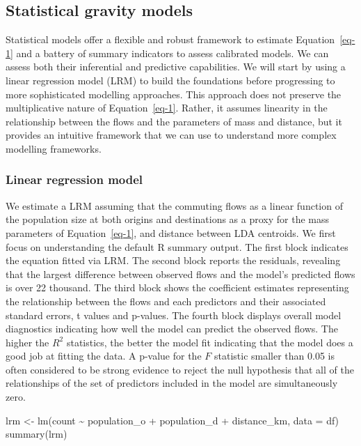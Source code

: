 \documentclass[
  a4paper, 
  twoside,
  final
]{article}
\newenvironment{Shaded}{\begin{snugshade}}{\end{snugshade}}
\newcommand{\AttributeTok}[1]{\textcolor[rgb]{0.40,0.45,0.13}{#1}}
\newcommand{\FunctionTok}[1]{\textcolor[rgb]{0.28,0.35,0.67}{#1}}
\newcommand{\NormalTok}[1]{\textcolor[rgb]{0.00,0.23,0.31}{#1}}
\newcommand{\OtherTok}[1]{\textcolor[rgb]{0.00,0.23,0.31}{#1}}
\newcommand{\SpecialCharTok}[1]{\textcolor[rgb]{0.37,0.37,0.37}{#1}}
\begin{document}
\hypertarget{statistical-gravity-models}{%
\subsection{Statistical gravity
models}\label{statistical-gravity-models}}

Statistical models offer a flexible and robust framework to estimate
Equation~\ref{eq-1} and a battery of summary indicators to assess
calibrated models. We can assess both their inferential and predictive
capabilities. We will start by using a linear regression model (LRM) to
build the foundations before progressing to more sophisticated modelling
approaches. This approach does not preserve the multiplicative nature of
Equation~\ref{eq-1}. Rather, it assumes linearity in the relationship
between the flows and the parameters of mass and distance, but it
provides an intuitive framework that we can use to understand more
complex modelling frameworks.

\hypertarget{linear-regression-model}{%
\subsubsection{Linear regression model}\label{linear-regression-model}}

We estimate a LRM assuming that the commuting flows as a linear function
of the population size at both origins and destinations as a proxy for
the mass parameters of Equation~\ref{eq-1}, and distance between LDA
centroids. We first focus on understanding the default R summary output.
The first block indicates the equation fitted via LRM. The second block
reports the residuals, revealing that the largest difference between
observed flows and the model's predicted flows is over 22 thousand. The
third block shows the coefficient estimates representing the
relationship between the flows and each predictors and their associated
standard errors, t values and p-values. The fourth block displays
overall model diagnostics indicating how well the model can predict the
observed flows. The higher the \(R^{2}\) statistics, the better the
model fit indicating that the model does a good job at fitting the data.
A p-value for the \(F\) statistic smaller than 0.05 is often considered
to be strong evidence to reject the null hypothesis that all of the
relationships of the set of predictors included in the model are
simultaneously zero.

\begin{Shaded}
\begin{Highlighting}[]
\NormalTok{lrm }\OtherTok{\textless{}{-}} \FunctionTok{lm}\NormalTok{(count }\SpecialCharTok{\textasciitilde{}}\NormalTok{ population\_o }\SpecialCharTok{+}\NormalTok{ population\_d }\SpecialCharTok{+}\NormalTok{ distance\_km,}
          \AttributeTok{data =}\NormalTok{ df)}
\FunctionTok{summary}\NormalTok{(lrm)}
\end{Highlighting}
\end{Shaded}
\end{document}
